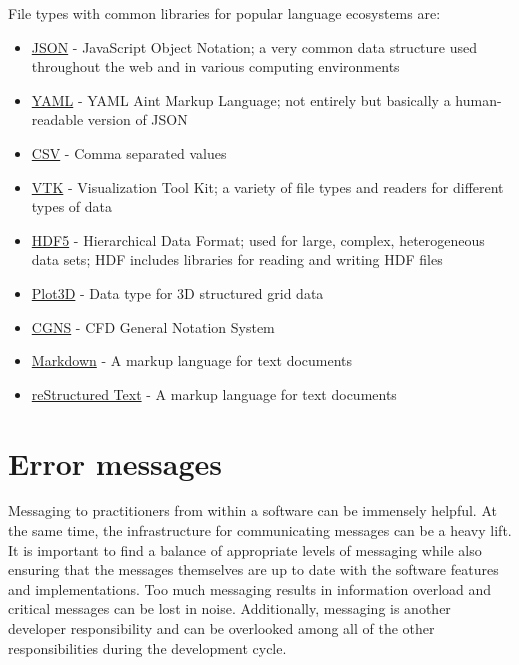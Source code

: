 \documentclass[]{nrel}
\begin{document}
File types with common libraries for popular language ecosystems are:
\begin{itemize}
\item \href{https://developer.mozilla.org/en-US/docs/Learn/JavaScript/Objects/JSON}{JSON} - JavaScript
    Object Notation; a very common data structure used throughout the web and in various
    computing environments
\item \href{https://yaml.org}{YAML} - YAML Aint Markup Language; not entirely but basically a
    human-readable version of JSON
\item \href{https://en.wikipedia.org/wiki/Comma-separated_values}{CSV} - Comma separated values
\item \href{https://examples.vtk.org/site/VTKFileFormats/}{VTK} - Visualization Tool Kit; a variety of
    file types and readers for different types of data
\item \href{https://portal.hdfgroup.org/display/HDF5/HDF5}{HDF5} - Hierarchical Data Format; used for large,
    complex, heterogeneous data sets; HDF includes libraries for reading and writing HDF files
\item \href{https://github.com/nasa/Plot3D_utilities}{Plot3D} - Data type for 3D structured grid data
\item \href{https://cgns.github.io/WhatIsCGNS.html}{CGNS} - CFD General Notation System
\item \href{https://www.markdownguide.org/getting-started/}{Markdown} - A markup language for text documents
\item \href{https://docutils.sourceforge.io/rst.html}{reStructured Text} - A markup language for text
    documents
\end{itemize}

\section{Error messages}
Messaging to practitioners from within a software can be immensely helpful.
At the same time, the infrastructure for communicating messages can be a heavy lift.
It is important to find a balance of appropriate levels of messaging while also ensuring that
the messages themselves are up to date with the software features and implementations.
Too much messaging results in information overload and critical messages can be lost in noise.
Additionally, messaging is another developer responsibility and can be overlooked among all of the
other responsibilities during the development cycle.
\end{document}
